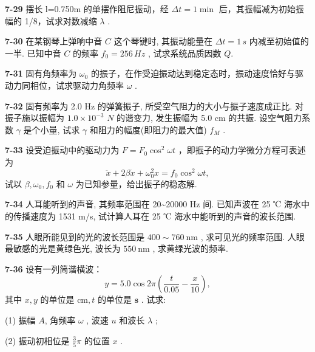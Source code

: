 \vfill

\newpage

\textbf{7-29} 摆长 l=0.750m 的单摆作阻尼振动，经 $\Delta t=1\min$ 后，其振幅减为初始振幅的 1/8，试求对数减缩 $\lambda$ .

\vfill

\textbf{7-30} 在某钢琴上弹响中音 $C$ 这个琴键时, 其振动能量在 $\Delta t = 1 \, s$ 内减至初始值的一半. 已知中音 $C$ 的频率 $f_{0} = 256 \, Hz$ , 试求系统品质因数 $Q$.

\vfill

\newpage

\textbf{7-31} 固有角频率为 $\omega_{0}$ 的振子，在作受迫振动达到稳定态时，振动速度恰好与驱动力同相位，试求驱动力角频率 $\omega$ .

\vfill

\textbf{7-32} 固有频率为 2.0 Hz 的弹簧振子, 所受空气阻力的大小与振子速度成正比. 对振子施以振幅为 $1.0 \times 10^{-3}$ $N$ 的谐变力, 发生振幅为 5.0 cm 的共振. 设空气阻力系数 $\gamma$ 是个小量, 试求 $\gamma$ 和阻力的幅度(即阻力的最大值) $f_{M}$ .

\vfill

\newpage

\textbf{7-33} 设受迫振动中的驱动力为 $F = F_{0} \cos^{2} \omega t$ ，即振子的动力学微分方程可表述为
\[
\ddot {x} + 2 \beta \dot {x} + \omega_ {0} ^ {2} x = f _ {0} \cos^ {2} \omega t,
\]
试以 $\beta, \omega_0, f_0$ 和 $\omega$ 为已知参量，给出振子的稳态解.

\vfill

\textbf{7-34} 人耳能听到的声音, 其频率范围在 20\textasciitilde{}20000 Hz 间. 已知声波在 25 ℃ 海水中的传播速度为 1531 m/s, 试计算人耳在 25 ℃ 海水中能听到的声音的波长范围.


\vfill

\newpage

\textbf{7-35} 人眼所能见到的光的波长范围是 $400 \sim 760 \mathrm{~nm}$ , 求可见光的频率范围. 人眼最敏感的光是黄绿色光, 波长为 $550 \mathrm{~nm}$ , 求黄绿光波的频率.


\vfill

\textbf{7-36} 设有一列简谐横波：
\[
y = 5. 0 \cos 2 \pi \left(\frac {t}{0 . 0 5} - \frac {x}{1 0}\right),
\]
其中 $x, y$ 的单位是 $\mathrm{cm}, t$ 的单位是 $\mathbf{s}$ . 试求:

(1) 振幅 $A$, 角频率 $\omega$ , 波速 $u$ 和波长 $\lambda$ ;

(2) 振动初相位是 $\frac{3}{5}\pi$ 的位置 $x$ .


\vfill

\newpage

